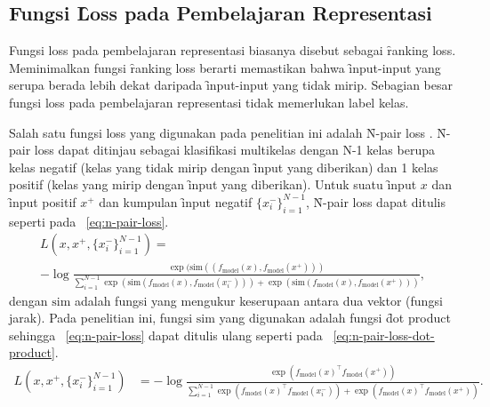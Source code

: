 \subsection{Fungsi \f{Loss} pada Pembelajaran Representasi}


Fungsi loss pada pembelajaran representasi biasanya disebut sebagai \f{ranking loss}. Meminimalkan fungsi \f{ranking loss} berarti memastikan bahwa \f{input-input} yang serupa berada lebih dekat daripada \f{input-input} yang tidak mirip. Sebagian besar fungsi loss pada pembelajaran representasi tidak memerlukan label kelas.

Salah satu fungsi loss yang digunakan pada penelitian ini adalah \f{N-pair loss} \citep{InfoNCE}. \f{N-pair loss} dapat ditinjau sebagai klasifikasi multikelas dengan N-1 kelas berupa kelas negatif (kelas yang tidak mirip dengan \f{input} yang diberikan) dan 1 kelas positif (kelas yang mirip dengan \f{input} yang diberikan). Untuk suatu \f{input} $x$ dan \f{input} positif $x^+$ dan kumpulan \f{input} negatif $\{x^-_i\}_{i=1}^{N-1}$, \f{N-pair loss} dapat ditulis seperti pada \equ~\ref{eq:n-pair-loss}.
\begin{align}
\label{eq:n-pair-loss}
\nonumber
 L(x, x^+, \{x^-_i\}_{i=1}^{N-1}) = \\
 -\log\frac{\exp(\text{sim}((f_\text{model}(x), f_\text{model}(x^+)))}{\sum_{i=1}^{N-1} \exp(\text{sim}(f_\text{model}(x), f_\text{model}(x^-_i)))+\exp(\text{sim}(f_\text{model}(x), f_\text{model}(x^+)))},
\end{align}
dengan $\text{sim}$ adalah fungsi yang mengukur keserupaan antara dua vektor (fungsi jarak). Pada penelitian ini, fungsi $\text{sim}$ yang digunakan adalah fungsi \f{dot product} sehingga \equ~\ref{eq:n-pair-loss} dapat ditulis ulang seperti pada \equ~\ref{eq:n-pair-loss-dot-product}.
\begin{align}
\label{eq:n-pair-loss-dot-product}
 L(x, x^+, \{x^-_i\}_{i=1}^{N-1}) &= -\log\frac{\exp(f_\text{model}(x)^{\top}f_\text{model}(x^+))}{\sum_{i=1}^{N-1} \exp(f_\text{model}(x)^{\top}f_\text{model}(x^-_i))+\exp(f_\text{model}(x)^{\top}f_\text{model}(x^+))}.
\end{align}

